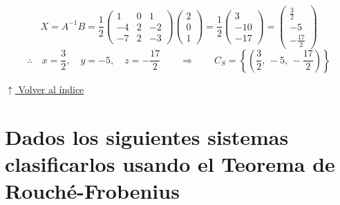 \documentclass[12pt]{article}
\newcommand{\volverindice}{%
    \vspace{1em}%
    \begin{flushright}%
        \hyperlink{indice}{\small $\uparrow$ Volver al índice}%
    \end{flushright}%
}
\begin{document}
\[
X = A^{-1}B = \frac{1}{2}\begin{pmatrix}1&0&1\\-4&2&-2\\-7&2&-3\end{pmatrix}
\begin{pmatrix}2\\0\\1\end{pmatrix}
= \frac{1}{2}\begin{pmatrix}3\\-10\\-17\end{pmatrix}
= \begin{pmatrix}\frac{3}{2}\\[4pt]-5\\[4pt]-\frac{17}{2}\end{pmatrix}
\]
\[
\therefore \quad x = \frac{3}{2},\quad y = -5,\quad z = -\frac{17}{2}
\qquad \Rightarrow \qquad C_S = \left\{\left(\frac{3}{2},\,-5,\,-\frac{17}{2}\right)\right\}
\]

\volverindice
\newpage

\section{Dados los siguientes sistemas clasificarlos usando el Teorema de Rouché-Frobenius}
\end{document}
